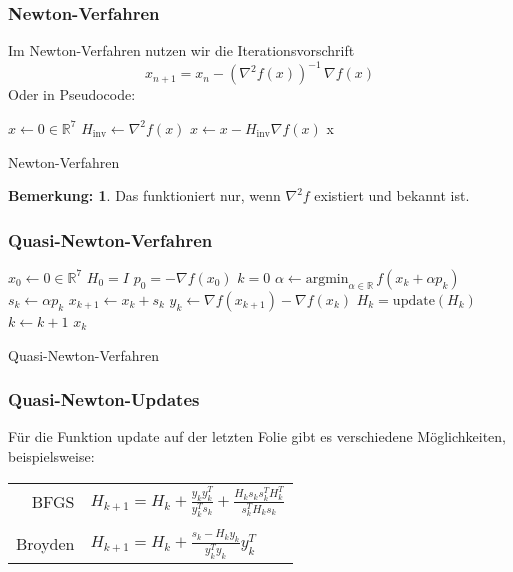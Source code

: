 \documentclass[xcolor = dvipsnames, notheorems, 10pt]{beamer}
\newcommand{\vth}{\vspace{4pt}}
\theoremstyle{definition}
\newtheorem{remark}		{Bemerkung:\vth}
\begin{document}
\begin{frame}
\frametitle{Newton-Verfahren}
	Im Newton-Verfahren nutzen wir die Iterationsvorschrift
	$$x_{n+1} = x_n - (\nabla^2 f(x))^{-1}\, \nabla f(x)$$
	Oder in Pseudocode:
	\begin{algorithm}[H]
		\begin{algorithmic}[1]
			\STATE $x \gets 0 \in \mathbb{R}^7$
				\STATE $H_\text{inv} \gets \nabla^2 f(x)$
				\STATE $x \gets x - H_\text{inv}\nabla f(x)$ 
			\ENDWHILE
			\RETURN x
		\end{algorithmic}
		\caption{Newton-Verfahren}
	\end{algorithm}
	\begin{remark}
		Das funktioniert nur, wenn $\nabla^2 f$ existiert und bekannt ist.
	\end{remark}
\end{frame}

\begin{frame}
\frametitle{Quasi-Newton-Verfahren}
	\begin{algorithm}[H]
		\begin{algorithmic}[1]
			\STATE $x_0 \gets 0 \in \mathbb{R}^7$
			\STATE $H_0 = I$
			\STATE $p_0 = -\nabla f(x_0)$
			\STATE $k = 0$
				\STATE $\alpha \gets \text{argmin}_{\alpha \in \mathbb{R}}\, f(x_k + \alpha p_k)$
				\STATE $s_k \gets \alpha p_k$
				\STATE $x_{k+1} \gets x_k+s_k$
				\STATE $y_k \gets \nabla f(x_{k+1}) - \nabla f(x_k)$
				\STATE $H_k = \text{update}(H_k)$
				\STATE $k \gets k+1$
			\ENDWHILE
			\RETURN $x_k$
		\end{algorithmic}
		\caption{Quasi-Newton-Verfahren}
	\end{algorithm}
\end{frame}

\begin{frame}
\frametitle{Quasi-Newton-Updates}
	Für die Funktion update auf der letzten Folie gibt es verschiedene Möglichkeiten, beispielsweise:
	\begin{center}
		\begin{tabular}{r|l}
			BFGS 		&	$H_{k+1} = H_k + \frac{y_k y_k^T}{y_k^T s_k} + \frac{H_k s_k s_k^T H_k^T}{s_k^T H_k s_k}$\\
			& \\
			Broyden 	&	$H_{k+1} = H_k + \frac{s_k - H_k y_k}{y_k^T y_k} y_k^T$
		\end{tabular}
	\end{center}
\end{frame}
\end{document}

